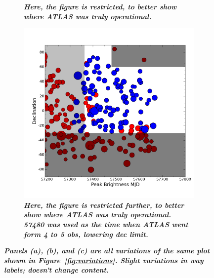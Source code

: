 \begin{figure}
\begin{subfigure}{.5\textwidth}
		\caption{\it \small{{\bf Here, the figure is restricted, to better show where ATLAS was truly operational.}}}
		\label{fig:var6}
	\end{subfigure}
	\begin{subfigure}{.5\textwidth}
	  \centering
			\includegraphics[width=1\linewidth]{figures/plot2useinPaper_restrictxfurther.png}
		\caption{\it \small{{\bf Here, the figure is restricted further, to better show where ATLAS was truly operational. 57480 was used as the time when ATLAS went form 4 to 5 obs, lowering dec limit.}}}
		\label{fig:var7}
	\end{subfigure}%
	\caption{\it \small{{\bf Panels (a), (b), and (c) are all variations of the same plot shown in Figure~\ref{fig:variations}. Slight variations in way labels; doesn't change content.}}}
	\label{fig:variations2}
\end{figure}




